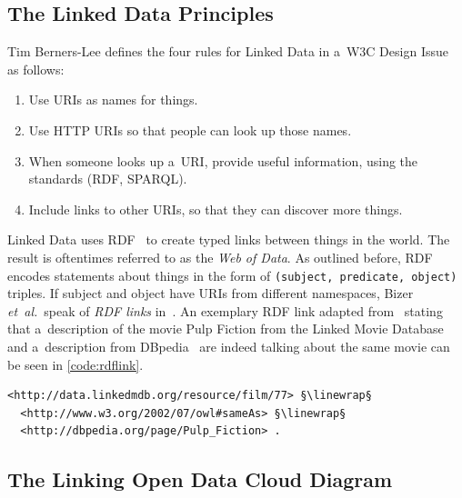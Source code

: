 \subsection{The Linked Data Principles}
\label{sec:linked-data-principles}

Tim Berners-Lee defines the four rules for Linked Data in a~W3C Design Issue~\cite{bernerslee2006linkeddata} as follows:

\begin{enumerate}
  \item Use URIs as names for things.
  \item Use HTTP URIs so that people can look up those names.
  \item When someone looks up a~URI, provide useful information,
        using the standards (RDF, SPARQL).
  \item Include links to other URIs,
        so that they can discover more things.
\end{enumerate}

Linked Data uses RDF~\cite{klyne2004rdf} to create
typed links between things in the world.
The result is oftentimes referred to as the \emph{Web of Data}.
As outlined before, RDF encodes statements
about things in the form of
\texttt{(subject, predicate, object)} triples.
If subject and object have URIs from different namespaces,
Bizer \emph{et~al.}\ speak of \emph{RDF links}
in~\cite{heath2011linkeddata}.
An exemplary RDF link adapted from~\cite{bizer2009linkeddatastory}
stating that a~description of the movie Pulp Fiction
from the Linked Movie Database~\cite{hassanzadeh2009linkedmovie}
and a~description from DBpedia~\cite{auer2007dbpedia}
are indeed talking about the same movie
can be seen in \autoref{code:rdflink}.

\begin{lstlisting}[caption={[Exemplary RDF link]{Exemplary RDF
  link stating that a~description of the movie Pulp Fiction from
  the Linked Movie Database~\cite{hassanzadeh2009linkedmovie}
  and a~description from DBpedia are indeed talking
  about the same movie}},
  label={code:rdflink},
  escapechar=§]
<http://data.linkedmdb.org/resource/film/77> §\linewrap§
  <http://www.w3.org/2002/07/owl#sameAs> §\linewrap§
  <http://dbpedia.org/page/Pulp_Fiction> .
\end{lstlisting}

\subsection{The Linking Open Data Cloud Diagram}
\label{sec:lodcloud}

